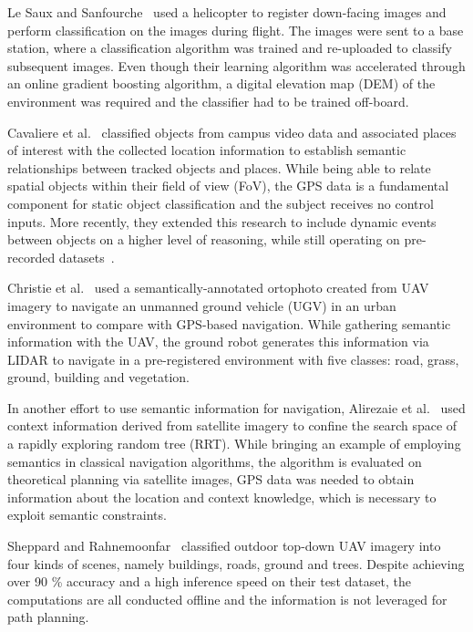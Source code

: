 \documentclass[a4paper,12pt]{article}
\theoremstyle{mytheor}
\begin{document}
Le Saux and Sanfourche~\cite{saux_rapid_2013} used a helicopter to register down-facing images and perform classification on the images during flight. The images were sent to a base station, where a classification algorithm was trained and re-uploaded to classify subsequent images. Even though their learning algorithm was accelerated through an online gradient boosting algorithm, a digital elevation map (DEM) of the environment was required and the classifier had to be trained off-board.

Cavaliere et al.~\cite{cavaliere_towards_2016} classified objects from campus video data and associated places of interest with the collected location information to establish semantic relationships between tracked objects and places. While being able to relate spatial objects within their field of view (FoV), the GPS data is a fundamental component for static object classification and the subject receives no control inputs. More recently, they extended this research to include dynamic events between objects on a higher level of reasoning, while still operating on pre-recorded datasets~\cite{cavaliere_empowering_2018}.

Christie et al.~\cite{christie_semantics_2016} used a semantically-annotated ortophoto created from UAV imagery to navigate an unmanned ground vehicle (UGV) in an urban environment to compare with GPS-based navigation. While gathering semantic information with the UAV, the ground robot generates this information via LIDAR to navigate in a pre-registered environment with five classes: road, grass, ground, building and vegetation. 

In another effort to use semantic information for navigation, Alirezaie et al.~\cite{alirezaie_exploiting_2017} used context information derived from satellite imagery to confine the search space of a rapidly exploring random tree (RRT). While bringing an example of employing semantics in classical navigation algorithms, the algorithm is evaluated on theoretical planning via satellite images, GPS data was needed to obtain information about the location and context knowledge, which is necessary to exploit semantic constraints.

Sheppard and Rahnemoonfar~\cite{sheppard_real-time_2017} classified outdoor top-down UAV imagery into four kinds of scenes, namely buildings, roads, ground and trees. Despite achieving over 90 \% accuracy and a high inference speed on their test dataset, the computations are all conducted offline and the information is not leveraged for path planning.
\end{document}
